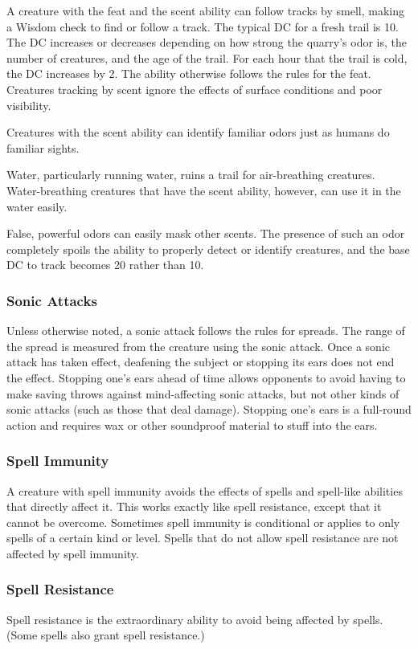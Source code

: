 A creature with the  feat and the scent ability can follow tracks by smell, making a Wisdom check to find or follow a track. The typical DC for a fresh trail is 10. The DC increases or decreases depending on how strong the quarry's odor is, the number of creatures, and the age of the trail. For each hour that the trail is cold, the DC increases by 2. The ability otherwise follows the rules for the  feat. Creatures tracking by scent ignore the effects of surface conditions and poor visibility.

Creatures with the scent ability can identify familiar odors just as humans do familiar sights.

Water, particularly running water, ruins a trail for air-breathing creatures. Water-breathing creatures that have the scent ability, however, can use it in the water easily.

False, powerful odors can easily mask other scents. The presence of such an odor completely spoils the ability to properly detect or identify creatures, and the base  DC to track becomes 20 rather than 10.

\subsubsection{Sonic Attacks}
Unless otherwise noted, a sonic attack follows the rules for spreads. The range of the spread is measured from the creature using the sonic attack. Once a sonic attack has taken effect, deafening the subject or stopping its ears does not end the effect. Stopping one's ears ahead of time allows opponents to avoid having to make saving throws against mind-affecting sonic attacks, but not other kinds of sonic attacks (such as those that deal damage). Stopping one's ears is a full-round action and requires wax or other soundproof material to stuff into the ears.

\subsubsection{Spell Immunity}
A creature with spell immunity avoids the effects of spells and spell-like abilities that directly affect it. This works exactly like spell resistance, except that it cannot be overcome. Sometimes spell immunity is conditional or applies to only spells of a certain kind or level. Spells that do not allow spell resistance are not affected by spell immunity.

\subsubsection{Spell Resistance}
Spell resistance is the extraordinary ability to avoid being affected by spells. (Some spells also grant spell resistance.)

